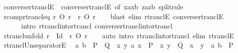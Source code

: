 \begin{isabellebody}
\isamarkupfalse%
\ converse{\isacharunderscore}{\kern0pt}rtranclE{}\ {\isacharequal}{\kern0pt}\ converse{\isacharunderscore}{\kern0pt}rtranclE\ {\isacharbrackleft}{\kern0pt}of\ {\isachardoublequoteopen}{\isacharparenleft}{\kern0pt}xa{\isacharcomma}{\kern0pt}xb{\isacharparenright}{\kern0pt}{\isachardoublequoteclose}\ {\isachardoublequoteopen}{\isacharparenleft}{\kern0pt}za{\isacharcomma}{\kern0pt}zb{\isacharparenright}{\kern0pt}{\isachardoublequoteclose}{\isacharcomma}{\kern0pt}\ split{\isacharunderscore}{\kern0pt}rule{\isacharbrackright}{\kern0pt}\isanewline
\isanewline
{}\isamarkupfalse%
\ r{\isacharunderscore}{\kern0pt}comp{\isacharunderscore}{\kern0pt}rtrancl{\isacharunderscore}{\kern0pt}eq{\isacharcolon}{\kern0pt}\ {\isachardoublequoteopen}r\ O\ r\isactrlsup {\isacharasterisk}{\kern0pt}\ {\isacharequal}{\kern0pt}\ r\isactrlsup {\isacharasterisk}{\kern0pt}\ O\ r{\isachardoublequoteclose}\isanewline
%
\isadelimproof
\ \ %
\endisadelimproof
%
\isatagproof
{}\isamarkupfalse%
\ {\isacharparenleft}{\kern0pt}blast\ elim{\isacharcolon}{\kern0pt}\ rtranclE\ converse{\isacharunderscore}{\kern0pt}rtranclE\isanewline
\ \ \ \ \ \ intro{\isacharcolon}{\kern0pt}\ rtrancl{\isacharunderscore}{\kern0pt}into{\isacharunderscore}{\kern0pt}rtrancl\ converse{\isacharunderscore}{\kern0pt}rtrancl{\isacharunderscore}{\kern0pt}into{\isacharunderscore}{\kern0pt}rtrancl{\isacharparenright}{\kern0pt}%
\endisatagproof
{\isafoldproof}%
%
\isadelimproof
\isanewline
%
\endisadelimproof
\isanewline
{}\isamarkupfalse%
\ rtrancl{\isacharunderscore}{\kern0pt}unfold{\isacharcolon}{\kern0pt}\ {\isachardoublequoteopen}r\isactrlsup {\isacharasterisk}{\kern0pt}\ {\isacharequal}{\kern0pt}\ Id\ {\isasymunion}\ r\isactrlsup {\isacharasterisk}{\kern0pt}\ O\ r{\isachardoublequoteclose}\isanewline
%
\isadelimproof
\ \ %
\endisadelimproof
%
\isatagproof
{}\isamarkupfalse%
\ {\isacharparenleft}{\kern0pt}auto\ intro{\isacharcolon}{\kern0pt}\ rtrancl{\isacharunderscore}{\kern0pt}into{\isacharunderscore}{\kern0pt}rtrancl\ elim{\isacharcolon}{\kern0pt}\ rtranclE{\isacharparenright}{\kern0pt}%
\endisatagproof
{\isafoldproof}%
%
\isadelimproof
\isanewline
%
\endisadelimproof
\isanewline
{}\isamarkupfalse%
\ rtrancl{\isacharunderscore}{\kern0pt}Un{\isacharunderscore}{\kern0pt}separatorE{\isacharcolon}{\kern0pt}\isanewline
\ \ {\isachardoublequoteopen}{\isacharparenleft}{\kern0pt}a{\isacharcomma}{\kern0pt}\ b{\isacharparenright}{\kern0pt}\ {\isasymin}\ {\isacharparenleft}{\kern0pt}P\ {\isasymunion}\ Q{\isacharparenright}{\kern0pt}\isactrlsup {\isacharasterisk}{\kern0pt}\ {\isasymLongrightarrow}\ {\isasymforall}x\ y{\isachardot}{\kern0pt}\ {\isacharparenleft}{\kern0pt}a{\isacharcomma}{\kern0pt}\ x{\isacharparenright}{\kern0pt}\ {\isasymin}\ P\isactrlsup {\isacharasterisk}{\kern0pt}\ {\isasymlongrightarrow}\ {\isacharparenleft}{\kern0pt}x{\isacharcomma}{\kern0pt}\ y{\isacharparenright}{\kern0pt}\ {\isasymin}\ Q\ {\isasymlongrightarrow}\ x\ {\isacharequal}{\kern0pt}\ y\ {\isasymLongrightarrow}\ {\isacharparenleft}{\kern0pt}a{\isacharcomma}{\kern0pt}\ b{\isacharparenright}{\kern0pt}\ {\isasymin}\ P\isactrlsup {\isacharasterisk}{\kern0pt}{\isachardoublequoteclose}\isanewline

\end{isabellebody}
